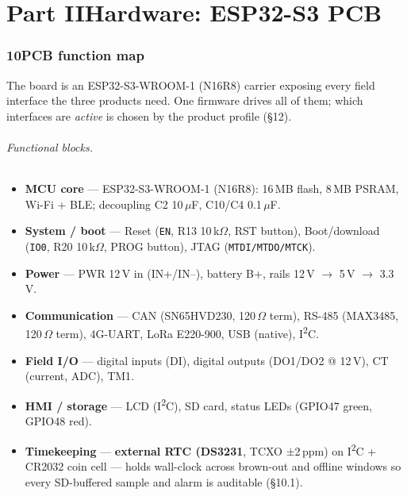 
\part*{Part II\quad Hardware: ESP32-S3 PCB}

\section*{10\quad PCB function map}
The board is an ESP32-S3-WROOM-1 (N16R8) carrier exposing every field interface the three
products need. One firmware drives all of them; which interfaces are \emph{active} is chosen by
the product profile (\S12).

\paragraph{Functional blocks.}
\begin{itemize}[leftmargin=1.4em,itemsep=1pt]
  \item \textbf{MCU core} — ESP32-S3-WROOM-1 (N16R8): 16\,MB flash, 8\,MB PSRAM, Wi-Fi + BLE;
        decoupling C2 10\,$\mu$F, C10/C4 0.1\,$\mu$F.
  \item \textbf{System / boot} — Reset (\texttt{EN}, R13 10\,k$\Omega$, RST button), Boot/download
        (\texttt{IO0}, R20 10\,k$\Omega$, PROG button), JTAG (\texttt{MTDI/MTDO/MTCK}).
  \item \textbf{Power} — PWR 12\,V in (IN+/IN--), battery B+, rails 12\,V $\to$ 5\,V $\to$ 3.3\,V.
  \item \textbf{Communication} — CAN (SN65HVD230, 120\,$\Omega$ term), RS-485 (MAX3485, 120\,$\Omega$ term),
        4G-UART, LoRa E220-900, USB (native), I\textsuperscript{2}C.
  \item \textbf{Field I/O} — digital inputs (DI), digital outputs (DO1/DO2 @ 12\,V), CT
        (current, ADC), TM1.
  \item \textbf{HMI / storage} — LCD (I\textsuperscript{2}C), SD card, status LEDs (GPIO47 green, GPIO48 red).
  \item \textbf{Timekeeping} — \textbf{external RTC (DS3231}, TCXO $\pm$2\,ppm) on I\textsuperscript{2}C + CR2032 coin
        cell — holds wall-clock across brown-out and offline windows so every SD-buffered sample and
        alarm is auditable (\S10.1).
\end{itemize}


